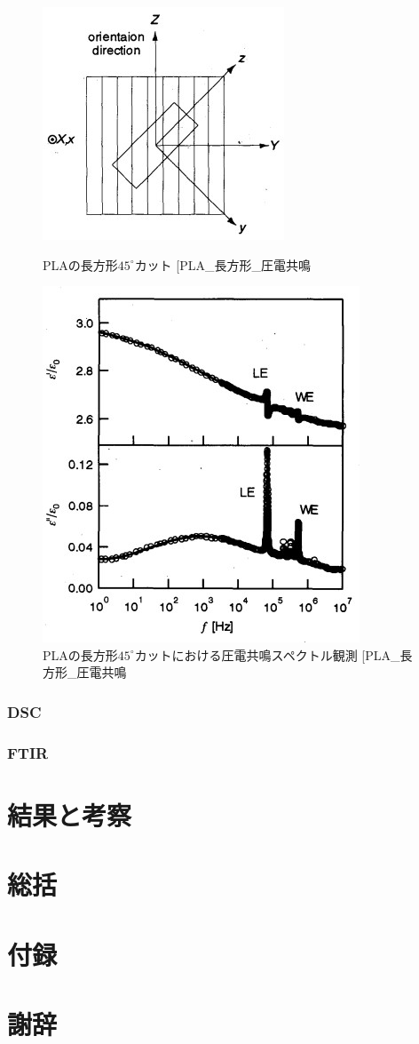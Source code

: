 \documentclass[dvipdfmx,12pt,a4paper]{jreport}
\makeatletter
\DeclareRobustCommand\cite{\unskip
    	\@ifnextchar[{\@tempswatrue\@citex}{\@tempswafalse\@citex[]}}
\makeatother
\begin{document}
			\begin{figure}[h]
				\centering
				\begin{minipage}{0.45\hsize}
					\centering
					\includegraphics{PLA_ずり圧電_長方形カット.jpg}
					\caption{PLAの長方形$45^\circ$カット\cite{PLA_長方形_圧電共鳴}}
					\label{PLA_45_cut}
				\end{minipage}
				\begin{minipage}{0.45\hsize}
					\centering
					\includegraphics{PLA_圧電共鳴スペクトル_長方形.jpg}
					\caption{PLAの長方形$45^{\circ}$カットにおける圧電共鳴スペクトル観測\cite{PLA_長方形_圧電共鳴}}
				\end{minipage}
			\end{figure}
			\newpage
			\subsection{DSC}
			\subsection{FTIR}
	\chapter{結果と考察}
	\chapter{総括}
	\chapter{付録}
	\chapter*{謝辞}
	
\end{document}
